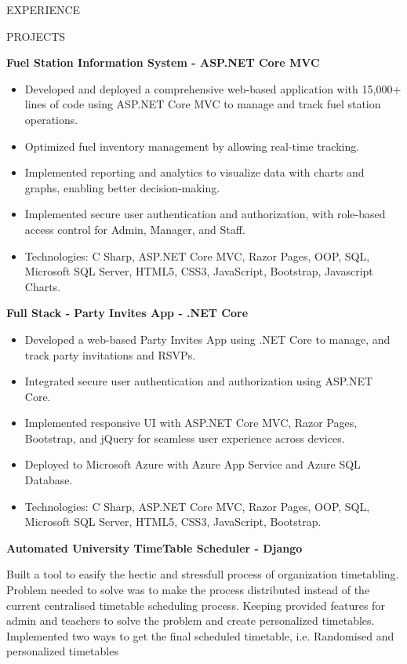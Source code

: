 \documentclass{resume} %
\begin{document}
\begin{rSection}{EXPERIENCE}
\begin{rSection}{PROJECTS}
\item \textbf{Fuel Station Information System - ASP.NET Core MVC}

\begin{itemize}
	\item Developed and deployed a comprehensive web-based application with 15,000+ lines of code using ASP.NET Core MVC to manage and track fuel station operations.
	\item Optimized fuel inventory management by allowing real-time tracking.
	\item Implemented reporting and analytics to visualize data with charts and graphs, enabling better decision-making.
	
	\item Implemented secure user authentication and authorization, with role-based access control for Admin, Manager, and Staff.
	\item Technologies: C Sharp, ASP.NET Core MVC, Razor Pages, OOP, SQL, Microsoft SQL Server, HTML5, CSS3, JavaScript, Bootstrap, Javascript Charts.
\end{itemize}

\item \textbf{Full Stack - Party Invites App - .NET Core}
\begin{itemize}
	\item Developed a web-based Party Invites App using .NET Core to  manage, and track party invitations and RSVPs.
	\item Integrated secure user authentication and authorization using ASP.NET Core.
	\item Implemented responsive UI with ASP.NET Core MVC, Razor Pages, Bootstrap, and jQuery for seamless user experience across devices.
	
	\item Deployed to Microsoft Azure with Azure App Service and Azure SQL Database.
	\item Technologies: C Sharp, ASP.NET Core MVC, Razor Pages, OOP, SQL, Microsoft SQL Server, HTML5, CSS3, JavaScript, Bootstrap.
\end{itemize}



\item \textbf{Automated University TimeTable Scheduler - Django}

\iffalse


 {Built a tool to easify the hectic and stressfull process of organization timetabling. Problem needed to solve was to make the process distributed instead of the current centralised timetable scheduling process. Keeping provided features for admin and teachers to solve the problem and create personalized timetables. Implemented two ways to get the final scheduled timetable, i.e. Randomised and personalized timetables}
 

\end{rSection}
\end{rSection}
\end{document}
